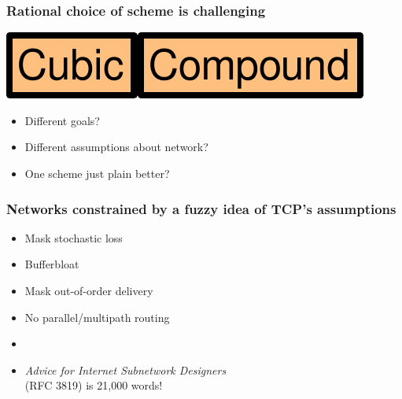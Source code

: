 \documentclass[svgnames]{beamer}
\newcommand{\ssline}{\vspace{8 pt}}
\begin{document}
\begin{frame}
\frametitle{Rational choice of scheme is challenging}

\begin{centering}
\includegraphics[height=20 pt]{cubic.pdf}\hspace{8 pt}{\bf vs.}\hspace{8 pt}\includegraphics[height=20 pt]{compound.pdf}

\end{centering}

\ssline
\ssline
\ssline

\begin{itemize}

\Large

\item Different goals?

\item Different assumptions about network?

\item One scheme just plain better?

\end{itemize}

\end{frame}

%
%
%
%
%
%
%

\begin{frame}
\frametitle{Networks constrained by a fuzzy idea of TCP's assumptions}

\Large

\begin{itemize}
\item Mask stochastic loss
\item Bufferbloat
\item Mask out-of-order delivery
\item No parallel/multipath routing
\item[]
\item[] {\it Advice for Internet Subnetwork Designers}\\ (RFC 3819) is 21,000 words!
\end{itemize}

\end{frame}
\end{document}
